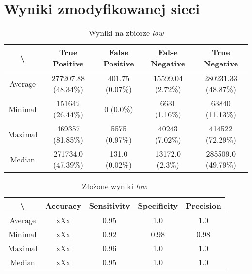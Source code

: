 \newpage
\section{Wyniki zmodyfikowanej sieci}
\label{sec:wyniki_zmodyfikowanej}

\begin{table}[!h]
	\centering
	\caption{Wyniki na zbiorze \textit{low}}
	\vspace{6pt}
	{\footnotesize
		\begin{tabular}{|c|c|c|c|c|}
			\hline \textbackslash & True Positive & False Positive & False Negative & True Negative \\
      \hline Average & 277207.88 (48.34\%) & 401.75 (0.07\%) & 15599.04 (2.72\%) & 280231.33 (48.87\%) \\
      \hline Minimal & 151642 (26.44\%) & 0 (0.0\%) & 6631 (1.16\%) & 63840 (11.13\%) \\
      \hline Maximal & 469357 (81.85\%) & 5575 (0.97\%) & 40243 (7.02\%) & 414522 (72.29\%) \\
      \hline Median & 271734.0 (47.39\%) & 131.0 (0.02\%) & 13172.0 (2.3\%) & 285509.0 (49.79\%) \\
      \hline
		\end{tabular}
	}
	\vspace{0pt}
\end{table}

\vspace{1cm}

\begin{table}[!h]
	\centering
	\caption{Złożone wyniki \textit{low}}
	\vspace{6pt}
	{\footnotesize
		\begin{tabular}{|c|c|c|c|c|}
			\hline \textbackslash & Accuracy & Sensitivity & Specificity & Precision \\
      \hline Average & xXx & 0.95 & 1.0 & 1.0 \\
      \hline Minimal & xXx & 0.92 & 0.98 & 0.98 \\
      \hline Maximal & xXx & 0.96 & 1.0 & 1.0 \\
      \hline Median & xXx & 0.95 & 1.0 & 1.0 \\
      \hline
		\end{tabular}
	}
	\vspace{0pt}
\end{table}




